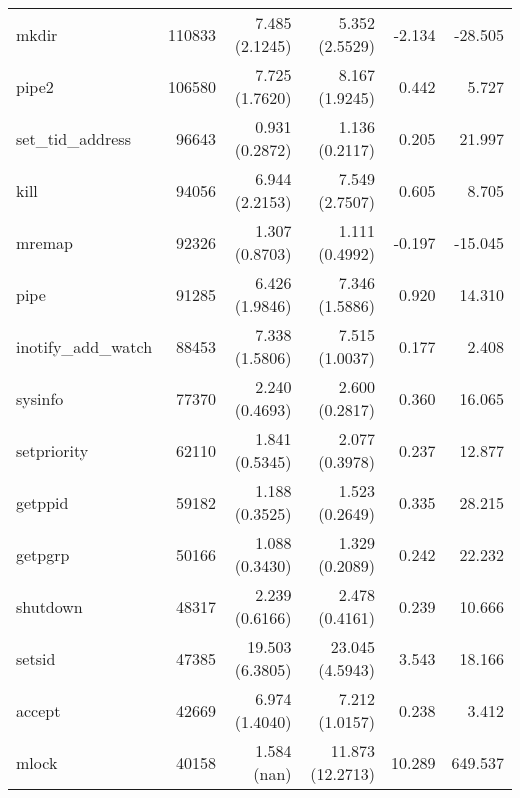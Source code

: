 \begin{longtable}{>{\ttfamily}lrrrrr}
                          mkdir &      110833 &           7.485 (2.1245) &           5.352 (2.5529) &          -2.134 &      -28.505 \\
                          pipe2 &      106580 &           7.725 (1.7620) &           8.167 (1.9245) &           0.442 &        5.727 \\
              set\_tid\_address &       96643 &           0.931 (0.2872) &           1.136 (0.2117) &           0.205 &       21.997 \\
                           kill &       94056 &           6.944 (2.2153) &           7.549 (2.7507) &           0.605 &        8.705 \\
                         mremap &       92326 &           1.307 (0.8703) &           1.111 (0.4992) &          -0.197 &      -15.045 \\
                           pipe &       91285 &           6.426 (1.9846) &           7.346 (1.5886) &           0.920 &       14.310 \\
            inotify\_add\_watch &       88453 &           7.338 (1.5806) &           7.515 (1.0037) &           0.177 &        2.408 \\
                        sysinfo &       77370 &           2.240 (0.4693) &           2.600 (0.2817) &           0.360 &       16.065 \\
                    setpriority &       62110 &           1.841 (0.5345) &           2.077 (0.3978) &           0.237 &       12.877 \\
                        getppid &       59182 &           1.188 (0.3525) &           1.523 (0.2649) &           0.335 &       28.215 \\
                        getpgrp &       50166 &           1.088 (0.3430) &           1.329 (0.2089) &           0.242 &       22.232 \\
                       shutdown &       48317 &           2.239 (0.6166) &           2.478 (0.4161) &           0.239 &       10.666 \\
                         setsid &       47385 &          19.503 (6.3805) &          23.045 (4.5943) &           3.543 &       18.166 \\
                         accept &       42669 &           6.974 (1.4040) &           7.212 (1.0157) &           0.238 &        3.412 \\
                          mlock &       40158 &              1.584 (nan) &         11.873 (12.2713) &          10.289 &      649.537 \\

\end{longtable}
